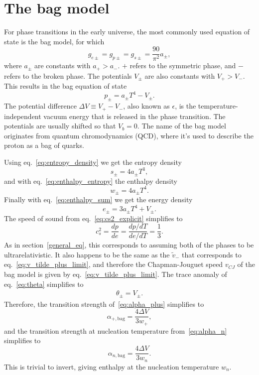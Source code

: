 \section{The bag model}
\label{bag_model}
For phase transitions in the early universe,
the most commonly used equation of state is the bag model, for which
\begin{equation}
g_{e\pm} = g_{p\pm} = g_{s\pm} = \frac{90}{\pi^2} a_\pm,
\end{equation}
where $a_\pm$ are constants with $a_+ > a_-$.
$+$ refers to the symmetric phase, and $-$ refers to the broken phase.
The potentials $V_\pm$ are also constants with $V_+ > V_-$.
This results in the bag equation of state
\cites[eq. 7.33]{lecture_notes}[eq. 8-9]{giese_2020}
\begin{equation}
p_\pm = a_\pm T^4 - V_\pm.
\label{eq:bag_p}
\end{equation}
The potential difference $\Delta V \equiv V_+ - V_-$, also known as $\epsilon$,
is the temperature-independent vacuum energy that is released in the phase transition.
The potentials are usually shifted so that $V_b = 0$.
The name of the bag model originates from quantum chromodynamics (QCD),
where it's used to describe the proton as a bag of quarks.
\cite{giese_2020}

Using eq.~\eqref{eq:entropy_density} we get the entropy density
\begin{equation}
s_\pm = 4 a_\pm T^3,
\end{equation}
and with eq.~\eqref{eq:enthalpy_entropy} the enthalpy density
\begin{equation}
w_\pm = 4 a_\pm T^4.
\end{equation}
Finally with eq.~\eqref{eq:enthalpy_sum} we get the energy density
\begin{equation}
e_\pm = 3 a_\pm T^4 + V_\pm.
\end{equation}
The speed of sound from eq.~\eqref{eq:cs2_explicit} simplifies to
\begin{equation}
c_s^2 = \frac{dp}{de} = \frac{dp/dT}{de/dT} = \frac{1}{3}.
\end{equation}
As in section~\ref{general_eq}, this corresponds to assuming both of the phases to be ultrarelativistic.
It also happens to be the same as the $\tilde{v}_-$ that corresponds to eq.~\eqref{eq:v_tilde_plus_limit},
and therefore the Chapman-Jouguet speed $v_{CJ}$ of the bag model is given by eq.~\eqref{eq:v_tilde_plus_limit}.
The trace anomaly of eq.~\eqref{eq:theta} simplifies to
\begin{align}
\theta_\pm = V_\pm.
\end{align}
Therefore, the transition strength of~\eqref{eq:alpha_plus} simplifies to
\begin{equation}
\alpha_{+,\text{bag}} = \frac{4 \Delta V}{3 w_+},
\label{eq:alpha_plus_bag}
\end{equation}
and the transition strength at nucleation temperature from~\eqref{eq:alpha_n} simplifies to
\begin{equation}
\alpha_{n,\text{bag}} = \frac{4 \Delta V}{3 w_n}.
\label{eq:alpha_n_bag}
\end{equation}
This is trivial to invert, giving enthalpy at the nucleation temperature $w_n$.
